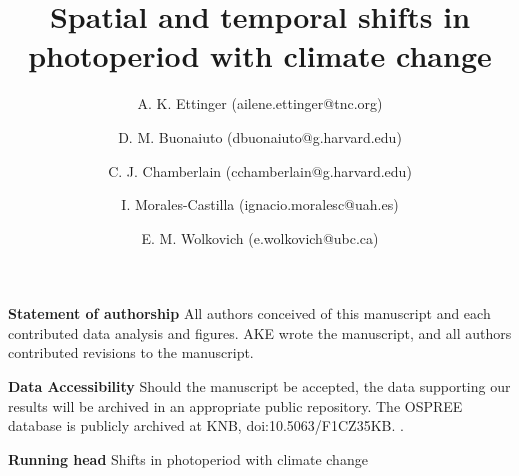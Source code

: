 \documentclass{article}
\begin{document}



\title{Spatial and temporal shifts in photoperiod with climate change} %


\author[1,2,a]{A. K. Ettinger (ailene.ettinger@tnc.org)}
\author[2,3]{D. M. Buonaiuto (dbuonaiuto@g.harvard.edu)}

\author[2,3]{C. J. Chamberlain (cchamberlain@g.harvard.edu)}

\author[2,3,4,5]{I. Morales-Castilla (ignacio.moralesc@uah.es)}

\author[2,3,6]{E. M. Wolkovich (e.wolkovich@ubc.ca)}






 



\maketitle %
\textbf{Statement of authorship} 
All authors conceived of this manuscript and each contributed data analysis and figures. AKE wrote the manuscript, and all authors contributed revisions to the manuscript. 

\textbf{Data Accessibility} Should the manuscript be accepted, the data supporting our results will be archived in an appropriate public repository. The OSPREE database is publicly archived at KNB, doi:10.5063/F1CZ35KB. \citep{wolkovich2019}.

\textbf{Running head} Shifts in photoperiod with climate change
\end{document}
